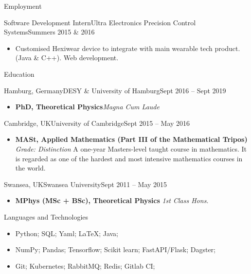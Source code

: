 \documentclass[]{mcdowellcv}
\begin{document}
\begin{cvsection}{Employment}
		\begin{cvsubsection}[2]{Software Development Intern}{Ultra Electronics Precision Control Systems}{Summers 2015 \& 2016}	
			\begin{itemize}
				\item Customised Hexiwear device to integrate with main wearable tech product. (Java \& C++). Web development.
			\end{itemize}
		\end{cvsubsection}
	\end{cvsection}
	
	\begin{cvsection}{Education}
 		\begin{cvsubsection}{Hamburg, Germany}{DESY \& University of Hamburg}{Sept 2016 -- Sept 2019}
            \begin{itemize}
				\item \textbf{PhD, Theoretical Physics}\hfill \textit{Magna Cum Laude}
			\end{itemize}
		\end{cvsubsection}
		\begin{cvsubsection}{Cambridge, UK}{University of Cambridge}{Sept 2015 -- May 2016}
            \begin{itemize}
				\item \textbf{MASt, Applied Mathematics (Part III of the Mathematical Tripos)} \hfill \textit{Grade: Distinction}\linebreak
                A one-year Masters-level taught course in mathematics. It is regarded as one of the hardest and most intensive mathematics courses in the world.
			\end{itemize}
		\end{cvsubsection}
  		\begin{cvsubsection}{Swansea, UK}{Swansea University}{Sept 2011 -- May 2015}
            \begin{itemize}
				\item \textbf{MPhys (MSc + BSc), Theoretical Physics} \hfill \textit{1st Class Hons.}
			\end{itemize}
		\end{cvsubsection}
	\end{cvsection}

	\begin{cvsection}{Languages and Technologies}
		\begin{cvsubsection}{}{}{}	
			\begin{itemize}
				\item Python; SQL; Yaml; \LaTeX; Java; 
				\item NumPy; Pandas; Tensorflow; Scikit learn; FastAPI/Flask; Dagster;
                \item Git; Kubernetes; RabbitMQ; Redis; Gitlab CI; 
			\end{itemize}
		\end{cvsubsection}
	\end{cvsection}
	
\end{document}
